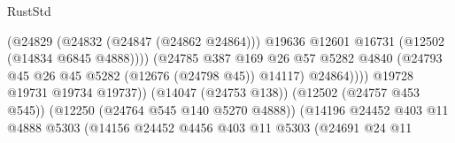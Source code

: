 \begin{lexlean}{RustStd}
\begin{coremodule}
                                                        (@24829
                                                          (@24832 (@24847 (@24862 @24864)))
                                                          @19636
                                                          @12601
                                                          @16731
                                                          (@12502 (@14834 @6845 @4888))))
                                                      (@24785
                                                        @387
                                                        @169
                                                        @26
                                                        @57
                                                        @5282
                                                        @4840
                                                        (@24793
                                                          @45
                                                          @26
                                                          @45
                                                          @5282
                                                          (@12676 (@24798 @45))
                                                          @14117)
                                                        @24864))))
                                                @19728
                                                @19731
                                                @19734
                                                @19737))
                                            (@14047 (@24753 @138))
                                            (@12502 (@24757 @453 @545))
                                            (@12250 (@24764 @545 @140 @5270 @4888))
                                            (@14196
                                              @24452
                                              @403
                                              @11
                                              @4888
                                              @5303
                                              (@14156
                                                @24452
                                                @4456
                                                @403
                                                @11
                                                @5303
                                                (@24691
                                                  @24
                                                  @11

\end{coremodule}
\end{lexlean}
